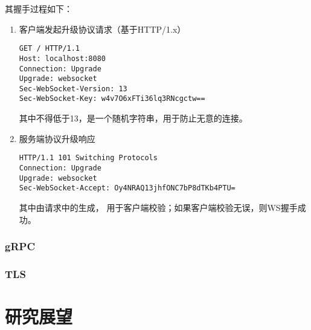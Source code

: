 其握手过程如下：

\begin{enumerate}
    \item 客户端发起升级协议请求（基于HTTP/1.x）\\
        \begin{lstlisting}
GET / HTTP/1.1 
Host: localhost:8080 
Connection: Upgrade 
Upgrade: websocket 
Sec-WebSocket-Version: 13 
Sec-WebSocket-Key: w4v7O6xFTi36lq3RNcgctw==
        \end{lstlisting}
        其中不得低于13，是一个随机字符串，用于防止无意的连接。
    \item 服务端协议升级响应 \\
        \begin{lstlisting}
HTTP/1.1 101 Switching Protocols
Connection: Upgrade
Upgrade: websocket
Sec-WebSocket-Accept: Oy4NRAQ13jhfONC7bP8dTKb4PTU=
        \end{lstlisting}
        其中由请求中的生成，
        用于客户端校验；如果客户端校验无误，则WS握手成功。
\end{enumerate}

\subsubsection{gRPC}
\subsubsection{TLS}
\section{研究展望}
\newpage
\printbibliography[title={参考文献}]
